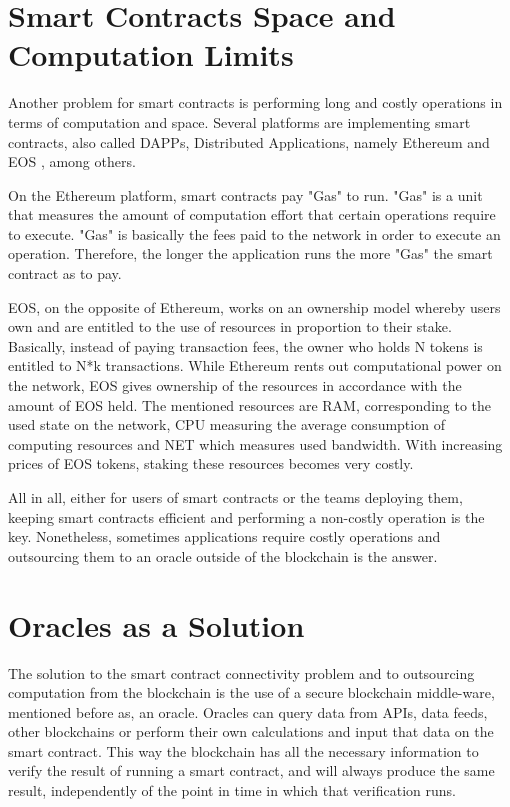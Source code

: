 \section{Smart Contracts Space and Computation Limits}

Another problem for smart contracts is performing long and costly operations in terms of computation and space. Several platforms are implementing smart contracts, also called DAPPs, Distributed Applications, namely Ethereum and EOS \citet{Block.one2018}, among others.

On the Ethereum platform, smart contracts pay "Gas" to run. "Gas" is a unit that measures the amount of computation effort that certain operations require to execute. "Gas" is basically the fees paid to the network in order to execute an operation. Therefore, the longer the application runs the more "Gas" the smart contract as to pay.

EOS, on the opposite of Ethereum, works on an ownership model whereby users own and are entitled to the use of resources in proportion to their stake. Basically, instead of paying transaction fees, the owner who holds N tokens is entitled to N*k transactions. While Ethereum rents out computational power on the network, EOS gives ownership of the resources in accordance with the amount of EOS held. The mentioned resources are RAM, corresponding to the used state on the network, CPU measuring the average consumption of computing resources and NET which measures used bandwidth. With increasing prices of EOS tokens, staking these resources becomes very costly.

All in all, either for users of smart contracts or the teams deploying them, keeping smart contracts efficient and performing a non-costly operation is the key. Nonetheless, sometimes applications require costly operations and outsourcing them to an oracle outside of the blockchain is the answer.



\section{Oracles as a Solution}
The solution to the smart contract connectivity problem and to outsourcing computation from the blockchain is the use of a secure blockchain middle-ware, mentioned before as, an oracle. Oracles can query data from APIs, data feeds, other blockchains or perform their own calculations and input that data on the smart contract. This way the blockchain has all the necessary information to verify the result of running a smart contract, and will always produce the same result, independently of the point in time in which that verification runs.



